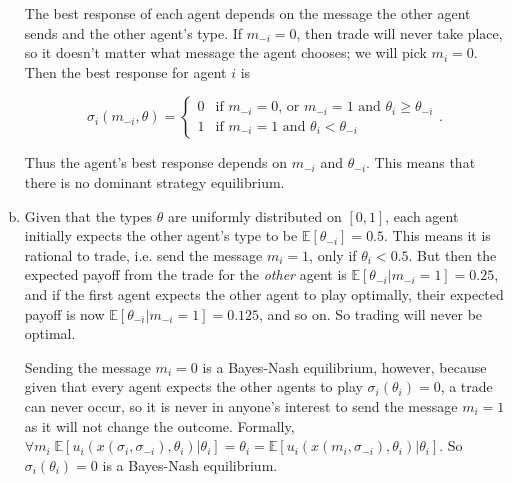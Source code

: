 \documentclass{article}
\begin{document}
\begin{enumerate}[(a)]
	The best response of each agent depends on the message the other agent sends and the other agent's type. If $m_{-i} = 0$, then trade will never take place, so it doesn't matter what message the agent chooses; we will pick $m_i = 0$. Then the best response for agent $i$ is

	\begin{equation*}
	\sigma_i(m_{-i}, \theta) = 
		\begin{cases} 
	      0 & \text{if } m_{-i} = 0 \text{, or } m_{-i} = 1 \text{ and } \theta_i \geq \theta_{-i} \\
	      1 & \text{if } m_{-i} = 1 \text{ and } \theta_i < \theta_{-i} 
	   \end{cases}.
	\end{equation*}

	Thus the agent's best response depends on $m_{-i}$ and $\theta_{-i}$. This means that there is no dominant strategy equilibrium.

	\item

	Given that the types $\theta$ are uniformly distributed on $[0,1]$, each agent initially expects the other agent's type to be $\mathbb{E}[\theta_{-i}] = 0.5$. This means it is rational to trade, i.e. send the message $m_i = 1$, only if $\theta_i  < 0.5$. But then the expected payoff from the trade for the \textit{other} agent is $\mathbb{E}[\theta_{-i} | m_{-i} = 1] = 0.25$, and if the first agent expects the other agent to play optimally, their expected payoff is now $\mathbb{E}[\theta_{-i} | m_{-i} = 1] = 0.125$, and so on. So trading will never be optimal.

	Sending the message $m_i = 0$ is a Bayes-Nash equilibrium, however, because given that every agent expects the other agents to play $\sigma_i(\theta_i) = 0$, a trade can never occur, so it is never in anyone's interest to send the message $m_i = 1$ as it will not change the outcome. Formally, $\forall m_i \;\mathbb{E}[ u_i(x(\sigma_i, \sigma_{-i}), \theta_i) | \theta_i]  = \theta_i = \mathbb{E}[u_i(x(m_i, \sigma_{-i}), \theta_i) | \theta_i]$. So $\sigma_i(\theta_i) = 0$ is a Bayes-Nash equilibrium.


\end{enumerate}
\end{document}
